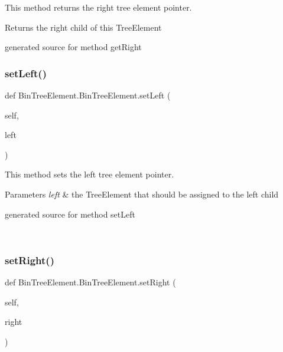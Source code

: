 This method returns the right tree element pointer. 

\begin{DoxyReturn}{Returns}
the right child of this Tree\+Element\begin{DoxyVerb}generated source for method getRight \end{DoxyVerb}
 
\end{DoxyReturn}
\hypertarget{class_bin_tree_element_1_1_bin_tree_element_a9d8856b4d16a7ba680ad699cc4328cd6}{}\label{class_bin_tree_element_1_1_bin_tree_element_a9d8856b4d16a7ba680ad699cc4328cd6} 
\subsubsection{\texorpdfstring{set\+Left()}{setLeft()}}
{\footnotesize\ttfamily def Bin\+Tree\+Element.\+Bin\+Tree\+Element.\+set\+Left (\begin{DoxyParamCaption}\item[{}]{self,  }\item[{}]{left }\end{DoxyParamCaption})}



This method sets the left tree element pointer. 


\begin{DoxyParams}{Parameters}
{\em left} & the Tree\+Element that should be assigned to the left child\begin{DoxyVerb}generated source for method setLeft \end{DoxyVerb}
 \\
\hline
\end{DoxyParams}
\hypertarget{class_bin_tree_element_1_1_bin_tree_element_a64f9dabb9089c9fd5b94a6cc6c262944}{}\label{class_bin_tree_element_1_1_bin_tree_element_a64f9dabb9089c9fd5b94a6cc6c262944} 
\subsubsection{\texorpdfstring{set\+Right()}{setRight()}}
{\footnotesize\ttfamily def Bin\+Tree\+Element.\+Bin\+Tree\+Element.\+set\+Right (\begin{DoxyParamCaption}\item[{}]{self,  }\item[{}]{right }\end{DoxyParamCaption})}



